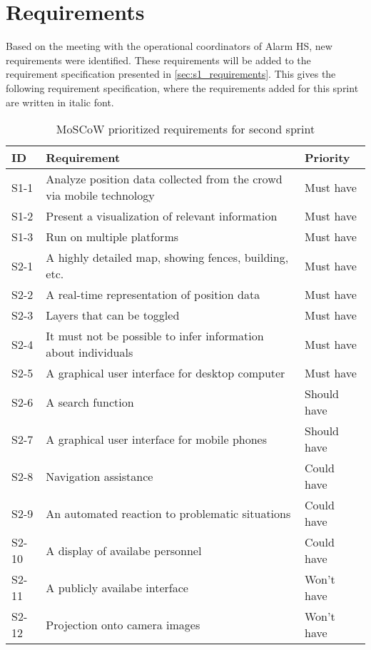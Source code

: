 \section{Requirements} \label{sec:s2_reqs}
Based on the meeting with the operational coordinators of Alarm HS, new requirements were identified. These requirements will be added to the requirement specification presented in \cref{sec:s1_requirements}. This gives the following requirement specification, where the requirements added for this sprint are written in italic font.

\begin{table}[htbp]
	\centering
	\begin{tabularx}{\textwidth}{lXl}
		\toprule
		\textbf{ID} & \textbf{Requirement} & \textbf{Priority} \\
		\toprule 
		
		\rowcolor[HTML]{EFEFEF} 
		S1-1  & Analyze position data collected from the crowd via mobile technology    & Must have \\
		S1-2  & Present a visualization of relevant information                         & Must have \\
		\rowcolor[HTML]{EFEFEF} 
		S1-3  & Run on multiple platforms                                               & Must have \\  
		S2-1  & A highly detailed map, showing fences, building, etc.                   & Must have \\
		\rowcolor[HTML]{EFEFEF} 
		S2-2  & A real-time representation of position data                                & Must have \\
		S2-3  & Layers that can be toggled                                                 & Must have \\
		\rowcolor[HTML]{EFEFEF} 
		S2-4  & It must not be possible to infer information about individuals             & Must have \\ 
		S2-5  & A graphical user interface for desktop computer & Must have \\
		\rowcolor[HTML]{EFEFEF} 
		S2-6  & A search function & Should have \\
		S2-7  & A graphical user interface for mobile phones & Should have \\
		\rowcolor[HTML]{EFEFEF} 
		S2-8  & Navigation assistance & Could have \\ 
		S2-9  & An automated reaction to problematic situations & Could have \\
		\rowcolor[HTML]{EFEFEF} 
		S2-10 & A display of availabe personnel & Could have \\
		S2-11 & A publicly availabe interface & Won't have \\
		\rowcolor[HTML]{EFEFEF} 
		S2-12 & Projection onto camera images & Won't have \\       
		\bottomrule
	\end{tabularx}
	\caption{MoSCoW prioritized requirements for second sprint}
	\label{tab:s2_req}
\end{table}


